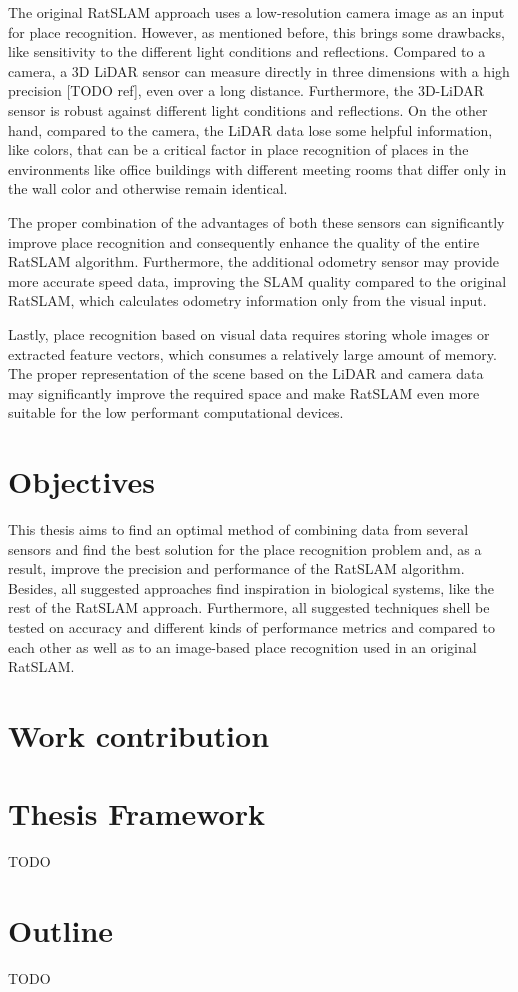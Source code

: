 The original RatSLAM approach uses a low-resolution camera image as an input for place recognition. However, as mentioned before, this brings some drawbacks, like sensitivity to the different light conditions and reflections. Compared to a camera, a 3D LiDAR sensor can measure directly in three dimensions with a high precision [TODO ref], even over a long distance. Furthermore, the 3D-LiDAR sensor is robust against different light conditions and reflections. On the other hand, compared to the camera, the LiDAR data lose some helpful information, like colors, that can be a critical factor in place recognition of places in the environments like office buildings with different meeting rooms that differ only in the wall color and otherwise remain identical.\par
The proper combination of the advantages of both these sensors can significantly improve place recognition and consequently enhance the quality of the entire RatSLAM algorithm. Furthermore, the additional odometry sensor may provide more accurate speed data, improving the SLAM quality compared to the original RatSLAM, which calculates odometry information only from the visual input.\par
Lastly, place recognition based on visual data requires storing whole images or extracted feature vectors, which consumes a relatively large amount of memory. The proper representation of the scene based on the LiDAR and camera data may significantly improve the required space and make RatSLAM even more suitable for the low performant computational devices.

\section{Objectives}

This thesis aims to find an optimal method of combining data from several sensors and find the best solution for the place recognition problem and, as a result, improve the precision and performance of the RatSLAM algorithm. Besides, all suggested approaches find inspiration in biological systems, like the rest of the RatSLAM approach. Furthermore, all suggested techniques shell be tested on accuracy and different kinds of performance metrics and compared to each other as well as to an image-based place recognition used in an original RatSLAM.


\section{Work contribution}


\section{Thesis Framework} %

TODO

\section{Outline}

TODO
